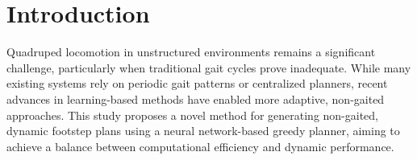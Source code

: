 \documentclass[../main.tex]{subfiles}
\begin{document}
\chapter{Introduction}

Quadruped locomotion in unstructured environments remains a
significant challenge, particularly when traditional gait cycles
prove inadequate. While many existing systems rely on periodic gait
patterns or centralized planners, recent advances in learning-based
methods have enabled more adaptive, non-gaited approaches. This study
proposes a novel method for generating non-gaited, dynamic footstep
plans using a neural network-based greedy planner, aiming to achieve
a balance between computational efficiency and dynamic performance.






\end{document}
